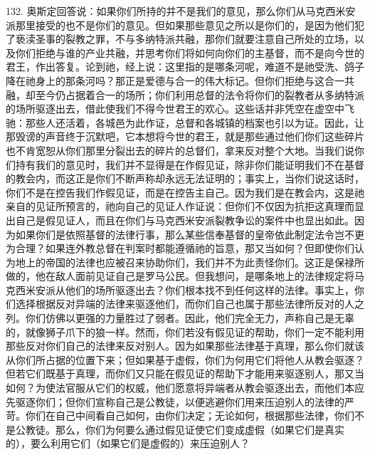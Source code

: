 132. 奥斯定回答说：如果你们所持的并不是我们的意见，那么你们从马克西米安派那里接受的也不是你们的意见。但如果那些意见之所以是你们的，是因为他们犯了亵渎圣事的裂教之罪，不与多纳特派共融，那你们就要注意自己所处的立场，以及你们拒绝与谁的产业共融，并思考你们将如何向你们的主基督，而不是向今世的君王，作出答复。论到祂，经上说：这里指的是哪条河呢，难道不是祂受洗、鸽子降在祂身上的那条河吗？那正是爱德与合一的伟大标记。但你们拒绝与这合一共融，却至今仍占据着合一的场所；你们利用总督的法令将你们的裂教者从多纳特派的场所驱逐出去，借此使我们不得今世君王的欢心。这些话并非凭空在虚空中飞驰：那些人还活着，各城邑为此作证，总督和各城镇的档案也引以为证。因此，让那毁谤的声音终于沉默吧，它本想将今世的君王，就是那些通过他们你们这些碎片也不肯宽恕从你们那里分裂出去的碎片的总督们，拿来反对整个大地。当我们说你们持有我们的意见时，我们并不显得是在作假见证，除非你们能证明我们不在基督的教会内，而这正是你们不断声称却永远无法证明的；事实上，当你们说这话时，你们不是在控告我们作假见证，而是在控告主自己。因为我们是在教会内，这是祂亲自的见证所预言的，祂向自己的见证人作证说：但你们不仅因为抗拒这真理而显出自己是假见证人，而且在你们与马克西米安派裂教争讼的案件中也显出如此。因为如果你们是依照基督的法律行事，那么某些信奉基督的皇帝依此制定法令岂不更为合理？如果连外教总督在判案时都能遵循祂的旨意，那又当如何？但即使你们认为地上的帝国的法律也应被召来协助你们，我们并不为此责怪你们。这正是保禄所做的，他在敌人面前见证自己是罗马公民。但我想问，是哪条地上的法律规定将马克西米安派从他们的场所驱逐出去？你们根本找不到任何这样的法律。事实上，你们选择根据反对异端的法律来驱逐他们，而你们自己也属于那些法律所反对的人之列。你们仿佛以更强的力量胜过了弱者。因此，他们完全无力，声称自己是无辜的，就像狮子爪下的狼一样。然而，你们若没有假见证的帮助，你们一定不能利用那些反对你们自己的法律来反对别人。因为如果那些法律基于真理，那么你们就该从你们所占据的位置下来；但如果基于虚假，你们为何用它们将他人从教会驱逐？但若它们既基于真理，而你们又只能在假见证的帮助下才能用来驱逐别人，那又当如何？为使法官服从它们的权威，他们愿意将异端者从教会驱逐出去，而他们本应先驱逐你们；但你们宣称自己是公教徒，以便逃避你们用来压迫别人的法律的严苛。你们在自己中间看自己如何，由你们决定；无论如何，根据那些法律，你们不是公教徒。那么，你们为何要么通过假见证使它们变成虚假（如果它们是真实的），要么利用它们（如果它们是虚假的）来压迫别人？\par


